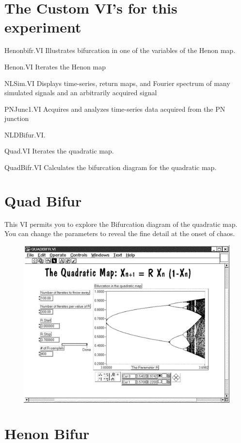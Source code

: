 \documentclass{../lab}
\begin{document}
\section{The Custom VI's for this experiment}

Henonbifr.VI Illustrates bifurcation in one of the variables of the Henon map.

Henon.VI Iterates the Henon map

NLSim.VI Displays time-series, return maps, and Fourier spectrum of many simulated signals and an arbitrarily acquired signal

PNJunc1.VI Acquires and analyzes time-series data acquired from the PN junction

NLDBifur.VI.

Quad.VI Iterates the quadratic map.

QuadBifr.VI Calculates the bifurcation diagram for the quadratic map.

\section{Quad Bifur}

This VI permits you to explore the Bifurcation diagram of the quadratic map. You can change the parameters to reveal the fine detail at the onset of chaos.


\begin{figure}[h]
    \centering
    \href{http://experimentationlab.berkeley.edu/sites/default/files/images/Nldimage138.gif}{\includegraphics[width=0.5\linewidth]{images/Nldimage138.png}}
    \caption{}
    \label{fig:Nldimage138}
\end{figure}

\section{Henon Bifur}
\end{document}

